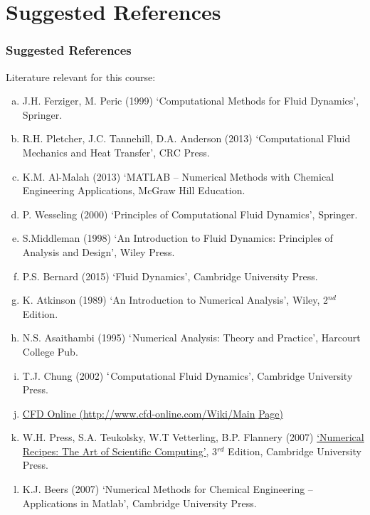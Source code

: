\documentclass[10pt,compress]{beamer}
\begin{document}
\section{Suggested References}


\begin{frame}
 \frametitle{Suggested References}
  Literature relevant for this course:
  \begin{enumerate}[(a)]\scriptsize
   \item J.H. Ferziger, M. Peric (1999) `Computational Methods for Fluid Dynamics', Springer.
   \item R.H. Pletcher, J.C. Tannehill, D.A. Anderson (2013) `Computational Fluid Mechanics and Heat Transfer', CRC Press.
   \item K.M. Al-Malah (2013) `MATLAB -- Numerical Methods with Chemical Engineering Applications, McGraw Hill Education.
   \item P. Wesseling (2000) `Principles of Computational Fluid Dynamics', Springer.
   \item S.Middleman (1998) `An Introduction to Fluid Dynamics: Principles of Analysis and Design', Wiley Press.
   \item P.S. Bernard (2015) `Fluid Dynamics', Cambridge University Press.
   \item K. Atkinson (1989) `An Introduction to Numerical Analysis', Wiley, 2$^{nd}$ Edition.
   \item N.S. Asaithambi (1995) $\lq$Numerical Analysis: Theory and Practice', Harcourt College Pub.
   \item T.J. Chung (2002) $\lq$Computational Fluid Dynamics', Cambridge University Press.
   \item \href{http://www.cfd-online.com/Wiki/Main_Page}{CFD Online (http://www.cfd-online.com/Wiki/Main$\_$Page)}
   \item W.H. Press, S.A. Teukolsky, W.T Vetterling, B.P. Flannery (2007) \href{http://www.nr.com/oldverswitcher.html}{`Numerical Recipes: The Art of Scientific Computing'}, 3$^{rd}$ Edition, Cambridge University Press.
   \item K.J. Beers (2007) `Numerical Methods for Chemical Engineering -- Applications in Matlab', Cambridge University Press.
  \end{enumerate}
\end{frame}
\end{document}
